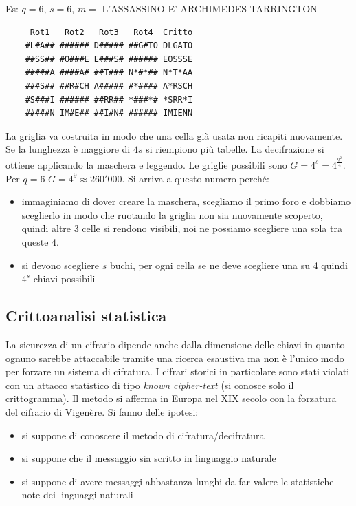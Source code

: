 Es: $q = 6$, $s = 6$, $m = $ L'ASSASSINO E' ARCHIMEDES TARRINGTON
\begin{verbatim}
     Rot1   Rot2   Rot3   Rot4  Critto
    #L#A## ###### D##### ##G#TO DLGATO
    ##SS## #O###E E###S# ###### EOSSSE
    #####A ####A# ##T### N*#*## N*T*AA
    ###S## ##R#CH A##### #*#### A*RSCH
    #S###I ###### ##RR## *###*# *SRR*I
    #####N IM#E## ##I#N# ###### IMIENN
\end{verbatim}

La griglia va costruita in modo che una cella già usata non ricapiti nuovamente. Se la lunghezza è maggiore di $4s$ si riempiono più tabelle. La decifrazione si ottiene applicando la maschera e leggendo. Le griglie possibili sono $G = 4^s = 4^{\frac{q^2}{4}}$. Per $q=6$ $G = 4^9 \approx 260'000$. Si arriva a questo numero perché:
\begin{itemize}
    \item immaginiamo di dover creare la maschera, scegliamo il primo foro e dobbiamo sceglierlo in modo che ruotando la griglia non sia nuovamente scoperto, quindi altre 3 celle si rendono visibili, noi ne possiamo scegliere una sola tra queste 4.
    \item si devono scegliere $s$ buchi, per ogni cella se ne deve scegliere una su 4 quindi $4^s$ chiavi possibili
\end{itemize}

\subsection{Crittoanalisi statistica}
La sicurezza di un cifrario dipende anche dalla dimensione delle chiavi in quanto ognuno sarebbe attaccabile tramite una ricerca esaustiva ma non è l'unico modo per forzare un sistema di cifratura. I cifrari storici in particolare sono stati violati con un attacco statistico di tipo \emph{known cipher-text} (si conosce solo il crittogramma). Il metodo si afferma in Europa nel XIX secolo con la forzatura del cifrario di Vigenère.
Si fanno delle ipotesi:
\begin{itemize}
    \item si suppone di conoscere il metodo di cifratura/decifratura
    \item si suppone che il messaggio sia scritto in linguaggio naturale
    \item si suppone di avere messaggi abbastanza lunghi da far valere le statistiche note dei linguaggi naturali
\end{itemize}


